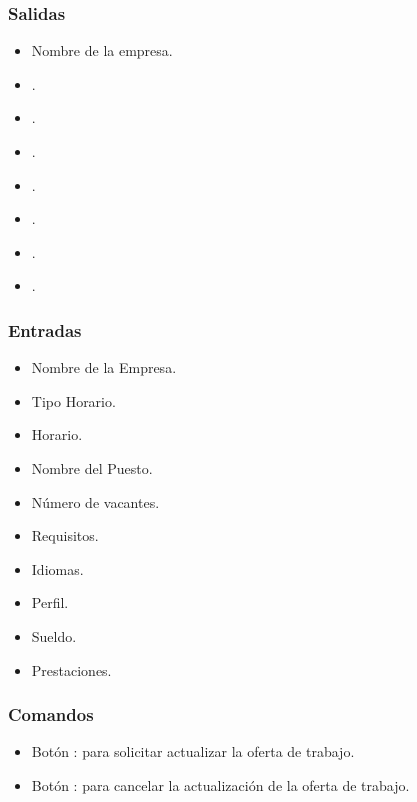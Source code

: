 \pagebreak
{}

\subsubsection{Salidas}
	\begin{itemize}
		\item Nombre de la empresa.
		\item {}.
		\item {}.
		\item {}.
		\item {}.
		\item {}.
		\item {}.
		\item {}.
	\end{itemize}

\subsubsection{Entradas}
	\begin{itemize}
		\item Nombre de la Empresa.
		\item Tipo Horario.
		\item Horario.
		\item Nombre del Puesto.
		\item Número de vacantes.
		\item Requisitos.
		\item Idiomas.
		\item Perfil.
		\item Sueldo.
		\item Prestaciones. 
	\end{itemize}

\subsubsection{Comandos}
	\begin{itemize}
		\item Botón : para solicitar actualizar la oferta de trabajo.  
		\item Botón : para cancelar la actualización de la oferta de trabajo.  
	\end{itemize}

